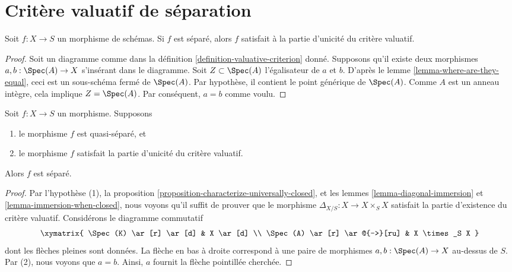 \section{Critère valuatif de séparation}
\label{section-valuative-separatedness}

\begin{lemma}
\label{lemma-separated-implies-valuative}
Soit $f : X \to S$ un morphisme de schémas.
Si $f$ est séparé, alors $f$ satisfait à la partie
d'unicité du critère valuatif.
\end{lemma}

\begin{proof}
Soit un diagramme comme dans la définition \ref{definition-valuative-criterion}
donné. Supposons qu'il existe deux morphismes
$a, b : \Spec(A) \to X$ s'insérant dans le diagramme.
Soit $Z \subset \Spec(A)$ l'égalisateur de $a$ et $b$. D'après le
lemme \ref{lemma-where-are-they-equal}, ceci est un sous-schéma
fermé de $\Spec(A)$. Par hypothèse, il contient le point
générique de $\Spec(A)$. Comme $A$ est un anneau intègre, cela
implique $Z = \Spec(A)$. Par conséquent, $a = b$ comme voulu.
\end{proof}

\begin{lemma}
\label{lemma-valuative-criterion-separatedness}
\begin{reference}
\cite[II Proposition 7.2.3]{EGA}
\end{reference}
Soit $f : X \to S$ un morphisme.
Supposons
\begin{enumerate}
\item le morphisme $f$ est quasi-séparé, et
\item le morphisme $f$ satisfait la partie
d'unicité du critère valuatif.
\end{enumerate}
Alors $f$ est séparé.
\end{lemma}

\begin{proof}
Par l'hypothèse (1),
la proposition \ref{proposition-characterize-universally-closed}, et
les lemmes \ref{lemma-diagonal-immersion} et \ref{lemma-immersion-when-closed},
nous voyons qu'il suffit de prouver que le
morphisme $\Delta_{X/S} : X \to X \times_S X$ satisfait la partie
d'existence du critère valuatif.
Considérons le diagramme commutatif
$$
\xymatrix{
\Spec(K) \ar[r] \ar[d] & X \ar[d] \\
\Spec(A) \ar[r] \ar@{-->}[ru] & X \times_S X
}
$$
dont les flèches pleines sont données. La flèche en bas à droite
correspond à une paire de morphismes $a, b : \Spec(A) \to X$ au-dessus
de $S$. Par (2), nous voyons que $a = b$. Ainsi, $a$ fournit la flèche
pointillée cherchée.
\end{proof}





